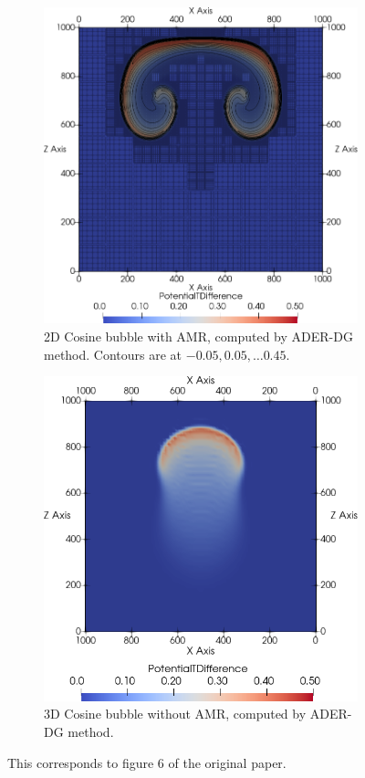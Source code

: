 \documentclass[runningheads]{llncs}
\begin{document}
\begin{figure}[htb]
  \begin{subfigure}[t]{0.45\columnwidth}
  \includegraphics[width=\textwidth]{screenshots/cosine_bubble_2d_dg.png}
  \caption{\label{fig:cosine-bubble-2d-dg-amr}%
  2D Cosine bubble with AMR, computed by ADER-DG method.
  Contours are at $-0.05, 0.05, \ldots 0.45$.
  }
  \end{subfigure}\quad
  \begin{subfigure}[t]{0.45\columnwidth}
  \includegraphics[width=1\textwidth]{screenshots/cosine_bubble_3d_dg.png}
  \caption{\label{fig:cosine-bubble-3d-dg-noamr}%
  3D Cosine bubble without AMR, computed by ADER-DG method.}
  \end{subfigure}
\caption{
  This corresponds to figure 6 of the original paper.
}
\end{figure}
\end{document}
